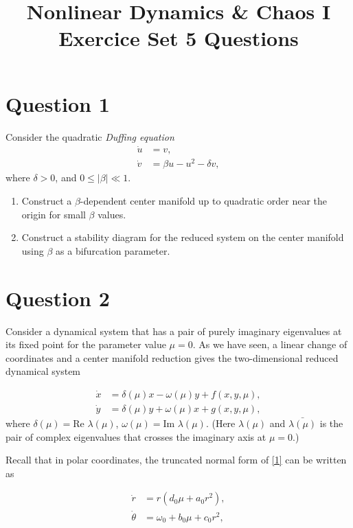 \documentclass[twoside,10pt,a4paper]{article}
\title{\huge \textbf{Nonlinear Dynamics \& Chaos I \\ \Large Exercice Set 5 Questions}}	%
\author{ }		%
\date{ }	%
\begin{document}
\maketitle

\section*{Question 1}
Consider the quadratic \textit{Duffing equation}
\begin{align*}
	\dot{u} &= v, \\
	\dot{v} &= \beta u - u^2 - \delta v,
\end{align*}
where $\delta > 0$, and $0 \leq |\beta| \ll 1$.

\begin{enumerate}[label=(\alph*)]
	\item Construct a $\beta$-dependent center manifold up to quadratic order near the origin for small $\beta$ values.
	\item Construct a stability diagram for the reduced system on the center manifold using $\beta$ as a bifurcation parameter.
\end{enumerate}


\section*{Question 2}
Consider a dynamical system that has a pair of purely imaginary eigenvalues at its fixed point for the parameter value $\mu=0$. As we have seen, a linear change of coordinates and a center manifold reduction gives the two-dimensional reduced dynamical system


\begin{align}
\label{1}
\dot{x} &= \delta(\mu)x - \omega(\mu)y + f(x, y, \mu), \\
\dot{y} &= \delta(\mu)y+\omega(\mu)x + g(x,y,\mu),
\end{align}
where $\delta(\mu)=\text{Re }\lambda(\mu)$, $\omega(\mu) = \text{Im }\lambda(\mu)$. (Here $\lambda(\mu)$ and $\bar{\lambda(\mu)}$ is the pair of complex eigenvalues that crosses the imaginary axis at $\mu=0$.)

Recall that in polar coordinates, the truncated normal form of \eqref{1} can be written as

\begin{align*}
\dot{r} &= r(d_0\mu + a_0 r^2), \\
\dot{\theta} &= \omega_0 + b_0\mu + c_0r^2,
\end{align*}
\end{document}
